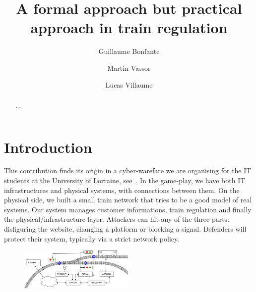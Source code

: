 \documentclass[runningheads]{llncs}
\begin{document}
%
\title{A formal approach but practical approach in train regulation}
%
%
\author{Guillaume Bonfante \and Martin Vassor  \and Lucas Villaume}
%
%
%
\maketitle
%
\begin{abstract}
	...

\end{abstract}


\section{Introduction}
\label{sec:introduction}

This contribution finds its origin in a cyber-warefare we are organising for the IT students at the University of Lorraine, see~\cite{CHE}. In the game-play, we have both IT infrastructures and physical systems, with connections between them. On the physical side, we built a small train network that tries to be a good model of real systems.  Our system manages customer informations, train regulation and finally the physical/infrastructure layer. Attackers can hit any of the three parts: disfiguring the website, changing a platform or blocking a signal. Defenders will protect their system, typically via a strict network policy.

\medskip

\begin{figure}
\vspace{-6mm}
\includegraphics[height=20mm]{TrainSchema.png}
\end{figure}
\end{document}

